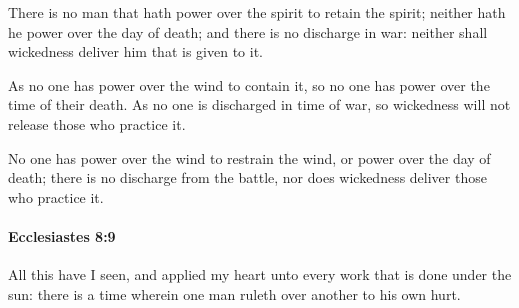 			\begin{versebox}
					\item[BHS] 
					\item[LXX] 
					\item[ASV] There is no man that hath power over the spirit to retain the spirit; neither hath he power over the day of death; and there is no discharge in war: neither shall wickedness deliver him that is given to it.
					\item[NIV] As no one has power over the wind to contain it, so no one has power over the time of their death. As no one is discharged in time of war, so wickedness will not release those who practice it.
					\item[NRSV] No one has power over the wind to restrain the wind, or power over the day of death; there is no discharge from the battle, nor does wickedness deliver those who practice it.
			\end{versebox}

		\paragraph{Ecclesiastes 8:9} %
			\label{ECCLESIASTES-8-9}

			All this have I seen, and applied my heart unto every work that is done under the sun: there is a time wherein one man ruleth over another to his own hurt.

